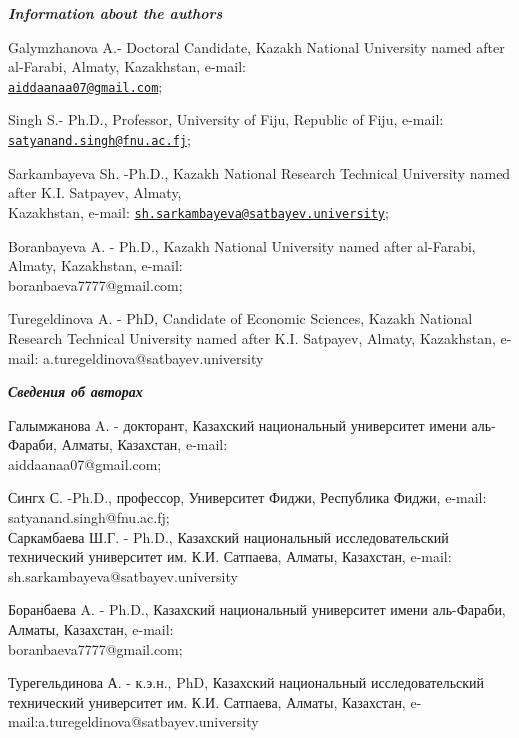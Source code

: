 \begin{authorinfo}
\emph{{\bfseries Information about the authors}}

Galymzhanova A.- Doctoral Candidate, Kazakh National University named
after al-Farabi, Almaty, Kazakhstan, e-mail:\\
\href{mailto:aiddaanaa07@gmail.com}{\nolinkurl{aiddaanaa07@gmail.com}};

Singh S.- Ph.D., Professor, University of Fiju, Republic of Fiju,
e-mail:
\href{mailto:satyanand.singh@fnu.ac.fj}{\nolinkurl{satyanand.singh@fnu.ac.fj}};

Sarkambayeva Sh. -Ph.D., Kazakh National Research Technical University
named after K.I. Satpayev, Almaty, \\Kazakhstan, e-mail:
\href{mailto:sh.sarkambayeva@satbayev.university}{\nolinkurl{sh.sarkambayeva@satbayev.university}};

Boranbayeva A. - Ph.D., Kazakh National University named after
al-Farabi, Almaty, Kazakhstan, e-mail: \\boranbaeva7777@gmail.com;

Turegeldinova A. - PhD, Candidate of Economic Sciences, Kazakh National
Research Technical University named after K.I. Satpayev, Almaty,
Kazakhstan, e-mail: a.turegeldinova@satbayev.university

\emph{{\bfseries Сведения об авторах}}

Галымжанова A. - докторант, Казахский национальный университет имени
аль-Фараби, Алматы, Казахстан, e-mail: \\aiddaanaa07@gmail.com;

Сингх С. -Ph.D., профессор, Университет Фиджи, Республика Фиджи, e-mail:
satyanand.singh@fnu.ac.fj;\\

Саркамбаева Ш.Г. - Ph.D., Казахский национальный исследовательский
технический университет им. К.И. Сатпаева, Алматы, Казахстан, e-mail:
sh.sarkambayeva@satbayev.university

Боранбаева A. - Ph.D., Казахский национальный университет имени
аль-Фараби, Алматы, Казахстан, e-mail: \\boranbaeva7777@gmail.com;

Турегельдинова А. - к.э.н., PhD, Казахский национальный
исследовательский технический университет им. К.И. Сатпаева, Алматы,
Казахстан, e-mail:a.turegeldinova@satbayev.university
\end{authorinfo}
